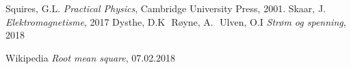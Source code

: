 \documentclass[%
 reprint,
nofootinbib,
aps,
]{revtex4-1}
\begin{document}
\begin{thebibliography}{9}
Squires, G.L. \emph{Practical Physics}, Cambridge University Press, 2001.
Skaar, J. \emph{Elektromagnetisme}, 2017
Dysthe, D.K\,\, Røyne, A.\,\, Ulven, O.I \emph{Strøm og spenning}, 2018

Wikipedia \emph{Root mean square}, 07.02.2018

\end{thebibliography}
\end{document}
